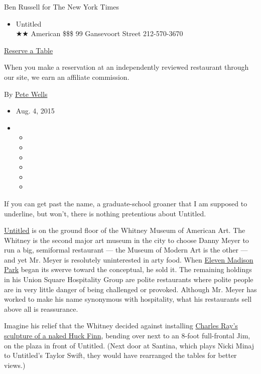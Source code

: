 Ben Russell for The New York Times

\begin{itemize}
\tightlist
\item
  Untitled\\
  ★★ American \$\$\$ 99 Gansevoort Street 212-570-3670
\end{itemize}

\href{http://www.opentable.com/single.aspx?ref=4201\&rid=169186}{Reserve
a Table}

When you make a reservation at an independently reviewed restaurant
through our site, we earn an affiliate commission.

By \href{http://www.nytimes3xbfgragh.onion/by/pete-wells}{Pete Wells}

\begin{itemize}
\item
  Aug. 4, 2015
\item
  \begin{itemize}
  \item
  \item
  \item
  \item
  \item
  \item
  \end{itemize}
\end{itemize}

If you can get past the name, a graduate-school groaner that I am
supposed to underline, but won't, there is nothing pretentious about
Untitled.

\href{http://www.untitledatthewhitney.com/}{Untitled} is on the ground
floor of the Whitney Museum of American Art. The Whitney is the second
major art museum in the city to choose Danny Meyer to run a big,
semiformal restaurant --- the Museum of Modern Art is the other --- and
yet Mr. Meyer is resolutely uninterested in arty food. When
\href{http://elevenmadisonpark.com/\#/menus}{Eleven Madison Park} began
its swerve toward the conceptual, he sold it. The remaining holdings in
his Union Square Hospitality Group are polite restaurants where polite
people are in very little danger of being challenged or provoked.
Although Mr. Meyer has worked to make his name synonymous with
hospitality, what his restaurants sell above all is reassurance.

Imagine his relief that the Whitney decided against installing
\href{http://www.chicagomag.com/arts-culture/June-2015/A-Homosocial-Sculpture-by-Charles-Ray-Debuts-at-the-Art-Institute-of-Chicago/}{Charles
Ray's sculpture of a naked Huck Finn}, bending over next to an 8-foot
full-frontal Jim, on the plaza in front of Untitled. (Next door at
Santina, which plays Nicki Minaj to Untitled's Taylor Swift, they would
have rearranged the tables for better views.)

